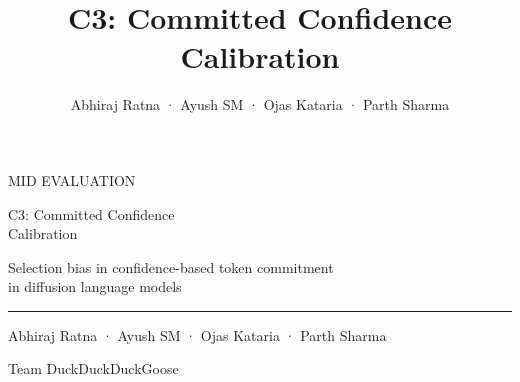\documentclass[aspectratio=169,10pt,t]{beamer}
\title{C3: Committed Confidence Calibration}
\author{Abhiraj Ratna · Ayush SM · Ojas Kataria · Parth Sharma}
\begin{document}
\begin{frame}[c,plain]
  \hspace*{4mm}\begin{minipage}{0.9\linewidth}\raggedright
    {\color{accent}\fontsize{9.5}{12}\selectfont\firasemibold MID EVALUATION}\par
    \vspace{4mm}
    {\fontsize{24}{28}\selectfont\firasemibold C3: Committed Confidence\\[1mm] Calibration}\par
    \vspace{3mm}
    {\color{ink2}\large Selection bias in confidence-based token commitment\\[0.6mm]
      in diffusion language models}\par
    \vspace{5mm}
    {\color{accent}\rule{14mm}{1.6pt}}\par
    \vspace{5mm}
    {\normalsize Abhiraj Ratna · Ayush SM · Ojas Kataria · Parth Sharma}\par
    \vspace{1.2mm}
    {\small\color{ink2}Team DuckDuckDuckGoose}
  \end{minipage}
\end{frame}
\end{document}
